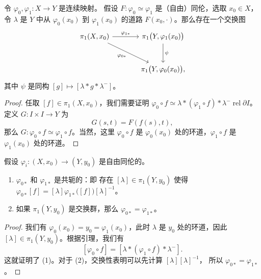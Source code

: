 \documentclass[fontset=none]{Notes}
\DeclareMathOperator\rel{rel}
\newcommand{\partI}{\partial I}
\newcommand{\relhomo}{\rel\partI}
\begin{document}
\begin{lemma}\label{lemma:free homotopy}
  令 $\varphi_0,\varphi_1:X\to Y$ 是连续映射。
  假设 $F:\varphi_0\simeq\varphi_1$ 是（自由）同伦，选取 $x_0\in X$，
  令 $\lambda$ 是 $Y$ 中从 $\varphi_0(x_0)$ 到 $\varphi_1(x_0)$
  的道路 $F(x_0,\cdot )$。那么存在一个交换图
  \[
    \begin{tikzcd}[sep=large]
      \pi_1(X,x_0)\arrow[r,"\varphi_{1*}"]\arrow[dr,"\varphi_{0*}"'] & \pi_1\bigl(Y,\varphi_1(x_0)\bigr)
      \arrow[d,"\psi"]\\
      & \pi_1\bigl(Y,\varphi_0(x_0)\bigr),
    \end{tikzcd}
  \]
  其中 $\psi$ 是同构 $[g]\mapsto [\lambda*g*\lambda^-]$。
\end{lemma}
\begin{proof}
  任取 $[f]\in\pi_1(X,x_0)$，我们需要证明
  $\varphi_0\circ f\simeq \lambda*(\varphi_1\circ f)*\lambda^-\relhomo$。
  定义 $G:I\times I\to Y$ 为
  \[
    G(s,t)=F(f(s),t),
  \]
  那么 $G:\varphi_0\circ f\simeq \varphi_1\circ f$。当然，这里
  $\varphi_0\circ f$ 是 $\varphi_0(x_0)$ 处的环道，$\varphi_1\circ f$
  是 $\varphi_1(x_0)$ 处的环道。
\end{proof}

\begin{corollary}
  假设 $\varphi_i:(X,x_0)\to (Y,y_0)$ 是自由同伦的。
  \begin{enumerate}
    \item $\varphi_{0*}$ 和 $\varphi_{1*}$ 是共轭的：即
    存在 $[\lambda]\in\pi_1(Y,y_0)$ 使得 
    $\varphi_{0*}[f]=[\lambda]\varphi_{1*}\bigl([f]\bigr)[\lambda]^{-1}$。
    \item 如果 $\pi_1(Y,y_0)$ 是交换群，那么 $\varphi_{0*}=\varphi_{1*}$。
  \end{enumerate}
\end{corollary}
\begin{proof}
  我们有 $\varphi_0(x_0)=y_0=\varphi_1(x_0)$，此时 $\lambda$ 是 $y_0$
  处的环道，因此 $[\lambda]\in\pi_1(Y,y_0)$。根据引理，我们有
  \[ 
    [\varphi_0\circ f]=[\lambda*(\varphi_1\circ f)*\lambda^-].
  \]
  这就证明了 (1)。对于 (2)，交换性表明可以先计算 $[\lambda][\lambda]^{-1}$，
  所以 $\varphi_{0*}=\varphi_{1*}$。
\end{proof}
\end{document}
